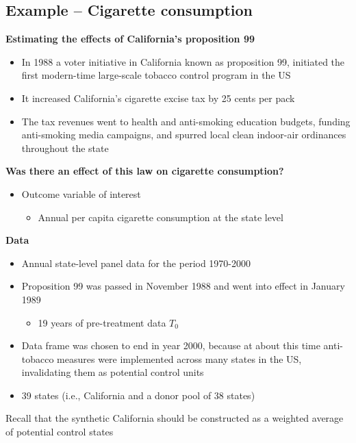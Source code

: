 \documentclass[10pt]{article}
\begin{document}
\subsection{Example -- Cigarette consumption}
\textbf{Estimating the effects of California's proposition 99} 
\begin{itemize}
    \item In 1988 a voter initiative in California known as proposition 99, initiated the first modern-time large-scale tobacco control program in the US 
    \item It increased California's cigarette excise tax by 25 cents per pack 
    \item The tax revenues went to health and anti-smoking education budgets, funding anti-smoking media campaigns, and spurred local clean indoor-air ordinances throughout the state
\end{itemize}
\textbf{Was there an effect of this law on cigarette consumption?}
\begin{itemize}
    \item Outcome variable of interest 
    \begin{itemize}
        \item Annual per capita cigarette consumption at the state level 
    \end{itemize}
\end{itemize}
\textbf{Data}
\begin{itemize}
    \item Annual state-level panel data for the period 1970-2000
    \item Proposition 99 was passed in November 1988 and went into effect in January 1989
    \begin{itemize}
        \item 19 years of pre-treatment data $T_0 $
    \end{itemize}
    \item Data frame was chosen to end in year 2000, because at about this time anti-tobacco measures were implemented across many states in the US, invalidating them as potential control units 
    \item 39 states (i.e., California and a donor pool of 38 states)
\end{itemize}
Recall that the synthetic California should be constructed as a weighted average of potential control states 
\end{document}
